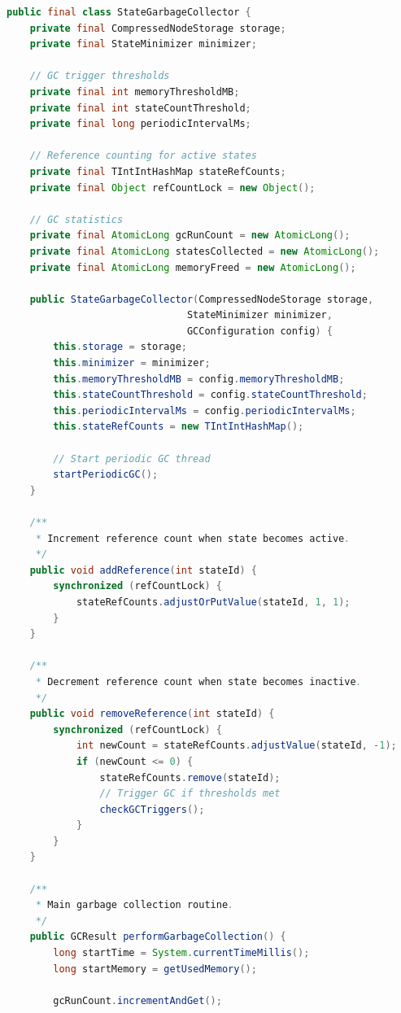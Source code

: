 \documentclass[11pt,a4paper]{article}
\begin{document}
\begin{lstlisting}[language=Java,caption={State Garbage Collection Implementation}]
public final class StateGarbageCollector {
    private final CompressedNodeStorage storage;
    private final StateMinimizer minimizer;
    
    // GC trigger thresholds
    private final int memoryThresholdMB;
    private final int stateCountThreshold;
    private final long periodicIntervalMs;
    
    // Reference counting for active states
    private final TIntIntHashMap stateRefCounts;
    private final Object refCountLock = new Object();
    
    // GC statistics
    private final AtomicLong gcRunCount = new AtomicLong();
    private final AtomicLong statesCollected = new AtomicLong();
    private final AtomicLong memoryFreed = new AtomicLong();
    
    public StateGarbageCollector(CompressedNodeStorage storage,
                               StateMinimizer minimizer,
                               GCConfiguration config) {
        this.storage = storage;
        this.minimizer = minimizer;
        this.memoryThresholdMB = config.memoryThresholdMB;
        this.stateCountThreshold = config.stateCountThreshold;
        this.periodicIntervalMs = config.periodicIntervalMs;
        this.stateRefCounts = new TIntIntHashMap();
        
        // Start periodic GC thread
        startPeriodicGC();
    }
    
    /**
     * Increment reference count when state becomes active.
     */
    public void addReference(int stateId) {
        synchronized (refCountLock) {
            stateRefCounts.adjustOrPutValue(stateId, 1, 1);
        }
    }
    
    /**
     * Decrement reference count when state becomes inactive.
     */
    public void removeReference(int stateId) {
        synchronized (refCountLock) {
            int newCount = stateRefCounts.adjustValue(stateId, -1);
            if (newCount <= 0) {
                stateRefCounts.remove(stateId);
                // Trigger GC if thresholds met
                checkGCTriggers();
            }
        }
    }
    
    /**
     * Main garbage collection routine.
     */
    public GCResult performGarbageCollection() {
        long startTime = System.currentTimeMillis();
        long startMemory = getUsedMemory();
        
        gcRunCount.incrementAndGet();
        

\end{lstlisting}
\end{document}
